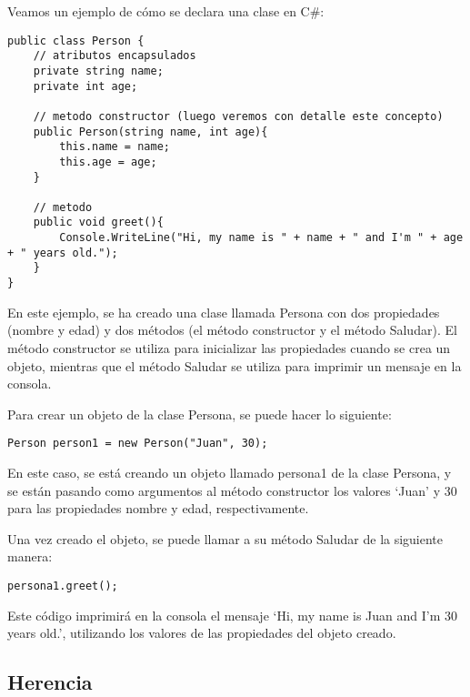 \documentclass[executivepaper]{article}
\begin{document}
Veamos un ejemplo de cómo se declara una clase en C\#:
\begin{lstlisting}[language={[Sharp]C}]
public class Person {
    // atributos encapsulados
    private string name;
    private int age;

    // metodo constructor (luego veremos con detalle este concepto)
    public Person(string name, int age){
        this.name = name;
        this.age = age;
    }

    // metodo
    public void greet(){
        Console.WriteLine("Hi, my name is " + name + " and I'm " + age + " years old.");
    }
}
\end{lstlisting}
En este ejemplo, se ha creado una clase llamada Persona con dos propiedades (nombre y edad) y dos métodos (el método constructor y el método Saludar). El método constructor se utiliza para inicializar las propiedades cuando se crea un objeto, mientras que el método Saludar se utiliza para imprimir un mensaje en la consola.

Para crear un objeto de la clase Persona, se puede hacer lo siguiente:

\begin{lstlisting}[language={[Sharp]C}]
Person person1 = new Person("Juan", 30);
\end{lstlisting}

En este caso, se está creando un objeto llamado persona1 de la clase Persona, y se están pasando como argumentos al método constructor los valores \enquote*{Juan} y 30 para las propiedades nombre y edad, respectivamente.

Una vez creado el objeto, se puede llamar a su método Saludar de la siguiente manera:

\begin{lstlisting}[language={[Sharp]C}]
persona1.greet();
\end{lstlisting}

Este código imprimirá en la consola el mensaje \enquote*{Hi, my name is  Juan and I'm 30 years old.}, utilizando los valores de las propiedades del objeto creado.

\subsection{Herencia}
\end{document}
